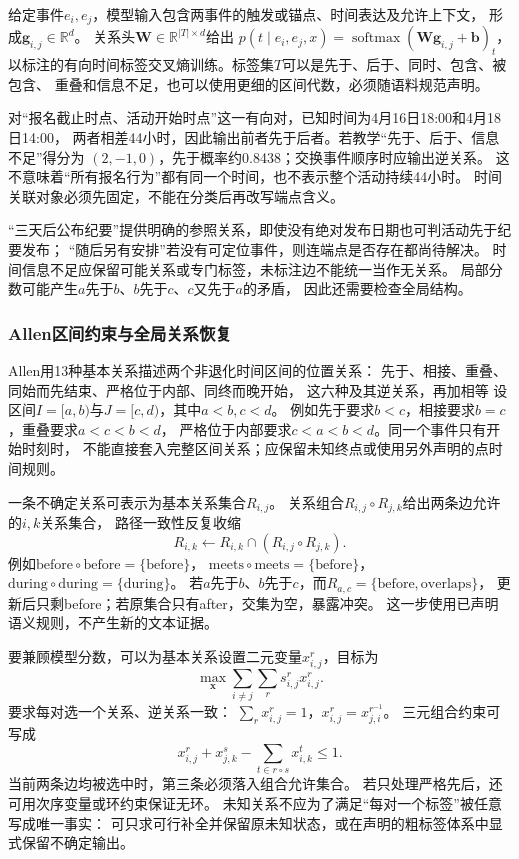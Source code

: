 给定事件$e_i,e_j$，模型输入包含两事件的触发或锚点、时间表达及允许上下文，
形成$\bm{g}_{i,j}\in\mathbb{R}^{d}$。
关系头$\bm{W}\in\mathbb{R}^{|T|\times d}$给出
$p(t\mid e_i,e_j,x)=\operatorname{softmax}(\bm{W}\bm{g}_{i,j}+\bm{b})_t$，
以标注的有向时间标签交叉熵训练。标签集$T$可以是先于、后于、同时、包含、被包含、
重叠和信息不足，也可以使用更细的区间代数，必须随语料规范声明。

对“报名截止时点、活动开始时点”这一有向对，已知时间为4月16日18:00和4月18日14:00，
两者相差44小时，因此输出前者先于后者。若教学“先于、后于、信息不足”得分为
$(2,-1,0)$，先于概率约0.8438；交换事件顺序时应输出逆关系。
这不意味着“所有报名行为”都有同一个时间，也不表示整个活动持续44小时。
时间关联对象必须先固定，不能在分类后再改写端点含义。

“三天后公布纪要”提供明确的参照关系，即使没有绝对发布日期也可判活动先于纪要发布；
“随后另有安排”若没有可定位事件，则连端点是否存在都尚待解决。
时间信息不足应保留可能关系或专门标签，未标注边不能统一当作无关系。
局部分数可能产生$a$先于$b$、$b$先于$c$、$c$又先于$a$的矛盾，
因此还需要检查全局结构。

\subsubsection{Allen区间约束与全局关系恢复}
\label{sec:nlp-extraction-allen}

Allen用13种基本关系描述两个非退化时间区间的位置关系：
先于、相接、重叠、同始而先结束、严格位于内部、同终而晚开始，
这六种及其逆关系，再加相等
设区间$I=[a,b)$与$J=[c,d)$，其中$a<b,c<d$。
例如先于要求$b<c$，相接要求$b=c$，重叠要求$a<c<b<d$，
严格位于内部要求$c<a<b<d$。同一个事件只有开始时刻时，
不能直接套入完整区间关系；应保留未知终点或使用另外声明的点时间规则。

一条不确定关系可表示为基本关系集合$R_{i,j}$。
关系组合$R_{i,j}\circ R_{j,k}$给出两条边允许的$i,k$关系集合，
路径一致性反复收缩
\begin{equation}
  R_{i,k}\leftarrow R_{i,k}\cap
      (R_{i,j}\circ R_{j,k}).
  \label{eq:nlp-extraction-allen-propagation}
\end{equation}
例如$\mathrm{before}\circ\mathrm{before}=\{\mathrm{before}\}$，
$\mathrm{meets}\circ\mathrm{meets}=\{\mathrm{before}\}$，
$\mathrm{during}\circ\mathrm{during}=\{\mathrm{during}\}$。
若$a$先于$b$、$b$先于$c$，而$R_{a,c}=\{\mathrm{before},\mathrm{overlaps}\}$，
更新后只剩before；若原集合只有after，交集为空，暴露冲突。
这一步使用已声明语义规则，不产生新的文本证据。

要兼顾模型分数，可以为基本关系设置二元变量$x_{i,j}^{r}$，目标为
\[
  \max_{\bm{x}}\sum_{i\ne j}\sum_r s_{i,j}^{r}x_{i,j}^{r}.
\]
要求每对选一个关系、逆关系一致：
$\sum_r x_{i,j}^{r}=1$，$x_{i,j}^{r}=x_{j,i}^{r^{-1}}$。
三元组合约束可写成
\begin{equation}
  x_{i,j}^{r}+x_{j,k}^{s}
  -\sum_{t\in r\circ s}x_{i,k}^{t}\leq1.
  \label{eq:nlp-extraction-temporal-ilp}
\end{equation}
当前两条边均被选中时，第三条必须落入组合允许集合。
若只处理严格先后，还可用次序变量或环约束保证无环。
未知关系不应为了满足“每对一个标签”被任意写成唯一事实：
可只求可行补全并保留原未知状态，或在声明的粗标签体系中显式保留不确定输出。

